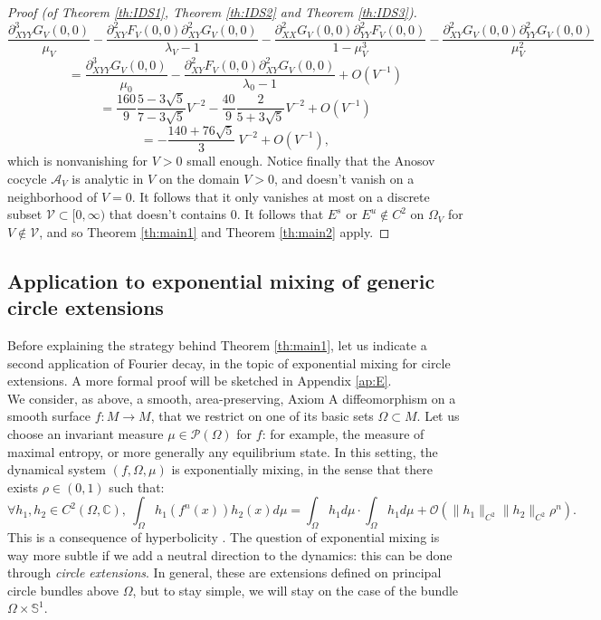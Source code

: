 \documentclass[a4paper]{article}
\theoremstyle{definition}
\begin{document}
\begin{proof}[Proof (of Theorem \ref{th:IDS1}, Theorem \ref{th:IDS2} and Theorem \ref{th:IDS3})]
$$ \frac{\partial^3_{XYY} G_V(0,0)}{\mu_V} - \frac{\partial_{XY}^2 F_V(0,0) \partial_{XY}^2 G_V(0,0)}{\lambda_V-1} - \frac{\partial_{XX}^2 G_V(0,0) \partial_{YY}^2 F_V(0,0)}{1-\mu_V^3} - \frac{\partial_{XY}^2 G_V(0,0) \partial_{YY}^2 G_V(0,0)}{\mu_V^2}  $$
$$ = \frac{\partial^3_{XYY} G_V(0,0)}{\mu_0} - \frac{\partial_{XY}^2 F_V(0,0) \partial_{XY}^2 G_V(0,0)}{\lambda_0-1} + O(V^{-1}) $$
$$ =  \frac{160}{9}\frac{5-3\sqrt{5}}{7-3\sqrt{5}} V^{-2} - \frac{40}{9} \frac{2}{5+3\sqrt{5}} V^{-2} + O(V^{-1}) $$
$$ = - \frac{140+76\sqrt{5}}{3} \ V^{-2} + O(V^{-1}), $$
which is nonvanishing for $V>0$ small enough. Notice finally that the Anosov cocycle $\mathcal{A}_V$ is analytic in $V$ on the domain $V>0$, and doesn't vanish on a neighborhood of $V=0$. It follows that it only vanishes at most on a discrete subset $\mathcal{V} \subset [0,\infty)$ that doesn't contains $0$. It follows that $E^s \text{ or } E^u \notin C^2$ on $\Omega_V$ for $V \notin \mathcal{V}$, and so Theorem \ref{th:main1} and Theorem \ref{th:main2} apply. \end{proof}

\subsection{Application to exponential mixing of generic circle extensions}

Before explaining the strategy behind Theorem \ref{th:main1}, let us indicate a second application of Fourier decay, in the topic of exponential mixing for circle extensions. A more formal proof will be sketched in Appendix \ref{ap:E}. \\

We consider, as above, a smooth, area-preserving, Axiom A diffeomorphism on a smooth surface $f:M \rightarrow M$, that we restrict on one of its basic sets $\Omega \subset M$. 
Let us choose an invariant measure $\mu \in \mathcal{P}(\Omega)$ for $f$: for example, the measure of maximal entropy, or more generally any equilibrium state. In this setting, the dynamical system $(f,\Omega,\mu)$ is exponentially mixing, in the sense that there exists $\rho \in (0,1)$ such that:
$$ \forall h_1,h_2 \in C^{2}(\Omega,\mathbb{C}), \ \int_\Omega h_1(f^n(x)) h_2(x) d\mu = \int_\Omega h_1 d\mu \cdot  \int_\Omega h_1 d\mu + \mathcal{O}( \|h_1\|_{C^2} \|h_2\|_{C^2} \rho^n).$$
This is a consequence of hyperbolicity \cite{PP90}. The question of exponential mixing is way more subtle if we add a neutral direction to the dynamics: this can be done through \emph{circle extensions}. In general, these are extensions defined on principal circle bundles above $\Omega$, but to stay simple, we will stay on the case of the bundle $\Omega \times \mathbb{S}^1$. 
\end{document}
